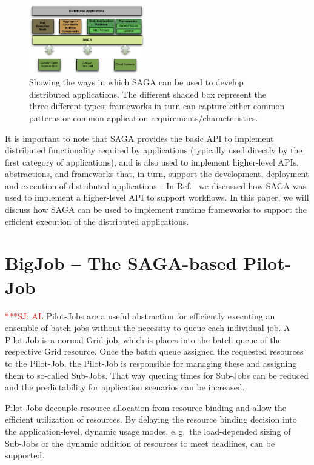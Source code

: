 \documentclass[conference,final]{IEEEtran}
\newcommand{\jhanote}[1]{ {\textcolor{red} { ***SJ: #1 }}}
\newcommand{\jhanote}[1]{}
\begin{document}
\begin{figure}[!ht]
  \begin{center}
    \includegraphics[width=0.45\textwidth]{distributed_applications_saga_figure.pdf}
  \end{center}
  \caption{\small Showing the ways in which SAGA can be used to
    develop distributed applications.  The different shaded box
    represent the three different types; frameworks in turn can
    capture either common patterns or common application
    requirements/characteristics. \label{Fig:sagaapps} }
\end{figure}

It is important to note that SAGA provides the basic API to
implement distributed functionality required by applications
(typically used directly by the first category of applications),
and is also used to implement higher-level APIs, abstractions, and
frameworks that, in turn, support the development, deployment and
execution of distributed
applications~\cite{gmac09,saga_data_intensive_abstractions}. In
Ref.~\cite{sagamontage09} we discussed how SAGA was used to
implement a higher-level API to support workflows. In this paper, 
we will discuss how SAGA can be used to implement runtime
frameworks to support the efficient execution of the distributed
applications.


\section{BigJob -- The SAGA-based Pilot-Job} \jhanote{AL}
Pilot-Jobs are a useful abstraction for efficiently executing an
ensemble of batch jobs without the necessity to queue each individual
job. A Pilot-Job is a normal Grid job, which is places into the batch
queue of the respective Grid resource. Once the batch queue assigned
the requested resources to the Pilot-Job, the Pilot-Job is responsible
for managing these and assigning them to so-called Sub-Jobs.  That way
queuing times for Sub-Jobs can be reduced and the predictability for
application scenarios can be increased.


Pilot-Jobs decouple resource allocation from resource binding and
allow the efficient utilization of resources. By delaying the resource
binding decision into the application-level, dynamic usage modes,
e.\,g.\ the load-depended sizing of Sub-Jobs or the dynamic addition
of resources to meet deadlines, can be supported.
\end{document}
